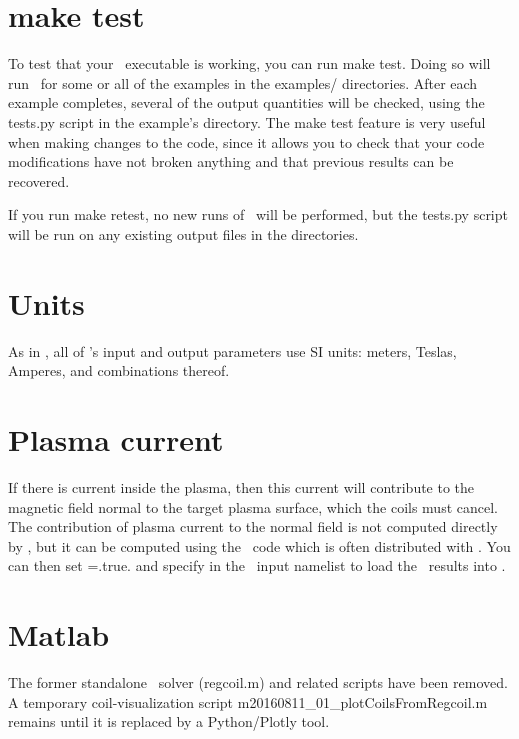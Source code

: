 \section{\ttfamily make test}

To test that your \regcoil~executable is working, you can run {\ttfamily make test}.  Doing so will run
\regcoil~for some or all of the examples in the {\ttfamily examples/} directories.
After each example completes, several of the output quantities
will be checked, using the
{\ttfamily tests.py} script in the example's directory.
The {\ttfamily make test} feature is very useful when making changes to the code, since it allows you to check
that your code modifications have not broken anything and that previous results
can be recovered.

If you run {\ttfamily make retest},
no new runs of \regcoil~will be performed, but the {\ttfamily tests.py} script
will be run on any existing output files in the  directories.

\section{Units}

As in \vmec, all of \regcoil's input and output parameters use SI units: meters, Teslas, Amperes, and combinations thereof.

\section{Plasma current}

If there is current inside the plasma, then this current will contribute to the magnetic field normal
to the target plasma surface, which the coils must cancel. The contribution of plasma current to the normal field
is not computed directly by \regcoil, but it can be computed using the \bnorm~code which is 
often distributed with \vmec.  You can then set ={\ttfamily .true.} and specify 
in the \regcoil~input namelist to load the \bnorm~results into \regcoil.

\section{Matlab}

The former standalone \matlab~solver ({\ttfamily regcoil.m}) and related scripts have been removed.
A temporary coil-visualization script {\ttfamily m20160811\_01\_plotCoilsFromRegcoil.m} remains
until it is replaced by a Python/Plotly tool.

